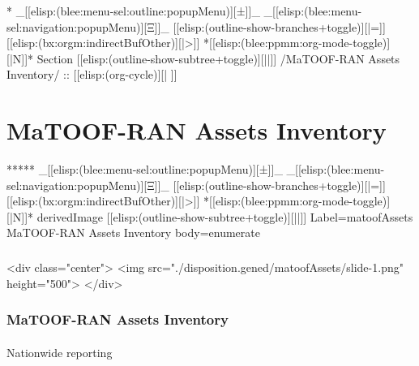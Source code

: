 \begin{whenOrg}
*  _[[elisp:(blee:menu-sel:outline:popupMenu)][±]]_ _[[elisp:(blee:menu-sel:navigation:popupMenu)][Ξ]]_ [[elisp:(outline-show-branches+toggle)][|=]] [[elisp:(bx:orgm:indirectBufOther)][|>]] *[[elisp:(blee:ppmm:org-mode-toggle)][|N]]*  Section    [[elisp:(outline-show-subtree+toggle)][||]]   /MaTOOF-RAN Assets Inventory/ ::  [[elisp:(org-cycle)][| ]]
\end{whenOrg}

\section{MaTOOF-RAN Assets Inventory}


\begin{whenOrg}
*****  _[[elisp:(blee:menu-sel:outline:popupMenu)][±]]_ _[[elisp:(blee:menu-sel:navigation:popupMenu)][Ξ]]_ [[elisp:(outline-show-branches+toggle)][|=]] [[elisp:(bx:orgm:indirectBufOther)][|>]] *[[elisp:(blee:ppmm:org-mode-toggle)][|N]]*  derivedImage [[elisp:(outline-show-subtree+toggle)][||]] Label=matoofAssets MaTOOF-RAN Assets Inventory body=enumerate
\end{whenOrg}

\begin{htmlonly}

\begin{frame}[fragile,plain,label=matoofAssets]
    \frametitle{}
    \framesubtitle{}
    \begin{rawhtml}
<div class="center">
<img src="./disposition.gened/matoofAssets/slide-1.png" height="500">
</div>
    \end{rawhtml}
\end{frame}
\end{htmlonly}

\begin{verblatex}

\begin{frame}[fragile,plain,label=matoofAssets]
    \frametitle{MaTOOF-RAN Assets Inventory}
    \framesubtitle{}

    Nationwide reporting


\end{frame}
\end{verblatex}
